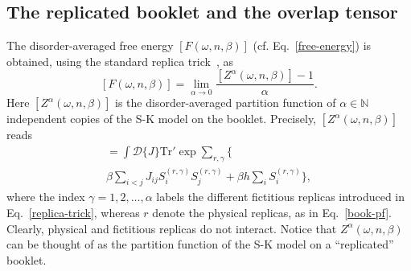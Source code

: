 \documentclass[twocolumn,superscriptaddress,prb,10pt]{revtex4-1}
\def\tr{\textrm{Tr}}
\begin{document}
\subsection{The replicated booklet and the overlap tensor}
\label{replica-sec}

The disorder-averaged free energy $[F(\omega,n,\beta)]$ (cf. 
Eq.~\eqref{free-energy}) is obtained, using the standard replica 
trick~\cite{cardy-book}, as  
%
\begin{equation}
\label{replica-trick}
[F(\omega,n,\beta)]=\lim_{\alpha\to 0}\frac{[Z^\alpha(\omega,n,\beta)]-1}
{\alpha}. 
\end{equation}
%
Here $[Z^\alpha(\omega,n,\beta)]$ is the disorder-averaged partition 
function of $\alpha\in\mathbb{N}$ independent copies of the S-K model on the 
booklet. Precisely, $[Z^\alpha(\omega,n,\beta)]$ reads 
%
\begin{multline}
[Z^\alpha(\omega,n,\beta)]=\int{\mathcal D}\{J\}
\tr'\exp\sum\limits_{r,\gamma}
\Big\{\\
\beta\sum\limits_{i<j}J_{ij}S_i^{(r,\gamma)}S_j^{(r,\gamma)}
+\beta h\sum\limits_{i}S^{(r,\gamma)}_i\Big\},
\label{rep-Z}
\end{multline}
%
where the index $\gamma=1,2,\dots,\alpha$ labels the different fictitious 
replicas introduced in Eq.~\eqref{replica-trick}, whereas $r$ denote the 
physical replicas, as in Eq.~\eqref{book-pf}. Clearly, physical and fictitious 
replicas do not interact. Notice that $Z^{\alpha}(\omega,n,\beta)$ can be 
thought of as the partition function of the S-K model on a ``replicated'' 
booklet. 
\end{document}
